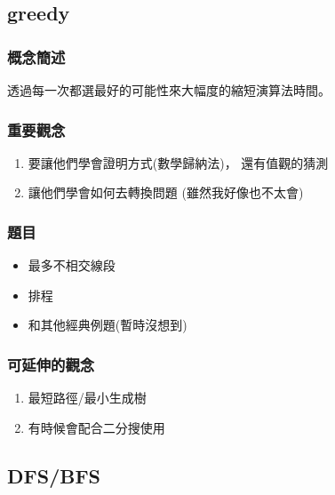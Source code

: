 \documentclass[12pt,oneside]{article}
\begin{document}
\subsection{greedy}
\subsubsection*{概念簡述}

透過每一次都選最好的可能性來大幅度的縮短演算法時間。

\subsubsection*{重要觀念}
\begin{adjustwidth}{2em}{0em}
\begin{enumerate}
    \item
        要讓他們學會證明方式(數學歸納法)，
        還有值觀的猜測
    \item 
        讓他們學會如何去轉換問題 (雖然我好像也不太會)
\end{enumerate}
\end{adjustwidth}

\subsubsection*{題目}

\begin{adjustwidth}{2em}{0em}
\begin{itemize}
    \item 最多不相交線段
    \item 排程
    \item 和其他經典例題(暫時沒想到)
\end{itemize}
\end{adjustwidth}


\subsubsection*{可延伸的觀念}
\begin{adjustwidth}{2em}{0em}
\begin{enumerate}
    \item 最短路徑/最小生成樹
    \item 有時候會配合二分搜使用
\end{enumerate}
\end{adjustwidth}

\clearpage
\subsection{DFS/BFS}
\end{document}
